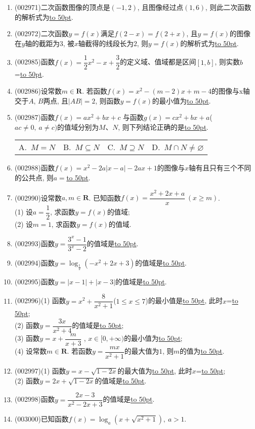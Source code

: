 \documentclass[10pt,a4paper]{article}
\newcommand{\blank}[1]{\underline{\hbox to #1pt{}}}
\newcommand{\fourch}[4]{\par\begin{tabular}{p{.23\textwidth}p{.23\textwidth}p{.23\textwidth}p{.23\textwidth}}
A.~#1 &B.~#2& C.~#3& D.~#4
\end{tabular}}
\begin{document}
\begin{enumerate}[1.]
\item {\tiny (002971)}二次函数图像的顶点是$(-1,2)$, 且图像经过点$(1,6)$, 则此二次函数的解析式为\blank{50}.
\item {\tiny (002972)}二次函数$y=f(x)$满足$f(2-x)=f(2+x)$, 且$y=f(x)$的图像在$y$轴的截距为$3$, 被$x$轴截得的线段长为$2$, 则$y=f(x)$的解析式为\blank{50}.
\item {\tiny (002985)}函数$f(x)=\dfrac 12x^2-x+\dfrac 32$的定义域、值域都是区间$[1,b]$, 则实数$b$=\blank{50}.
\item {\tiny (002986)}设常数$m\in \mathbf{R}$. 若函数$f(x)=x^2-(m-2)x+m-4$的图像与x轴交于$A$, $B$两点, 且$|AB|=2$, 则函数$y=f(x)$的最小值为\blank{50}.
\item {\tiny (002987)}函数$f(x)=ax^2+bx+c$ 与函数$g(x)=cx^2+bx+a$($ac\ne 0,\ a\ne c)$的值域分别为$M$、$N$, 则下列结论正确的是\blank{50}.
\fourch{$M=N$}{$M\subseteq N$}{$M\supseteq N$}{$M\cap N\ne \varnothing$}
\item {\tiny (002988)}函数$f(x)=x^2-2a|x-a|-2ax+1$的图像与$x$轴有且只有三个不同的公共点, 则$a=$\blank{50}.
\item {\tiny (002990)}设常数$a,m\in \mathbf{R}$. 已知函数$f(x)=\dfrac{x^2+2x+a}x\  (x\ge m)$.\\
(1) 设$a=\dfrac 12$, 求函数$y=f(x)$的值域;\\
(2) 设$m=1$, 求函数$y=f(x)$的值域.
\item {\tiny (002993)}函数$y=\dfrac{3^x-1}{3^x-2}$的值域是\blank{50}.
\item {\tiny (002994)}函数$y=\log_{\frac 12}(-x^2+2x+3)$的值域是\blank{50}.
\item {\tiny (002995)}函数$y=|x-1|+|x-3|$的值域是\blank{50}.
\item {\tiny (002996)}(1) 函数$y=x^2+\dfrac 8{x^2+1}$($1\le x\le 7$)的最小值是\blank{50}, 此时$x$=\blank{50};\\
(2) 函数$y=\dfrac{3x}{x^2+4}$的值域是\blank{50};\\
(3) 函数$y=x+\dfrac m{x+3}$ , $x\in [0,+\infty)$的最小值为\blank{50};\\
(4) 设常数$m\in \mathbf{R}$. 若函数$y=\dfrac{mx}{x^2+1}$的最大值为$1$, 则$m$的值为\blank{50}.
\item {\tiny (002997)}(1) 函数$y=x-\sqrt{1-2x}$的最大值为\blank{50}, 此时$x$=\blank{50};\\
(2) 函数$y=2x+\sqrt{1-2x}$的值域是\blank{50}.
\item {\tiny (002998)}函数$y=\dfrac{2x-3}{x^2-2x+3}$的值域是\blank{50}.
\item {\tiny (003000)}已知函数$f(x)=\log_a(x+\sqrt{x^2+1}), \ a>1$.\\

\end{enumerate}
\end{document}
